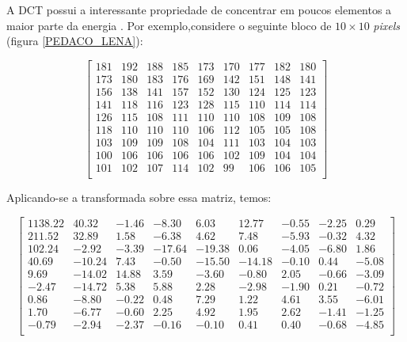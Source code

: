 A DCT possui a interessante propriedade de concentrar em poucos elementos a maior parte da energia \cite{khayam2003discrete}. Por exemplo,considere o seguinte bloco de $10 \times 10$ \textit{pixels} (figura \ref{PEDACO_LENA}):

\begin{center}
\begin{equation}
\label{lena}
\begin{bmatrix}
  181&  192&  188&  185&  173&  170&  177&  182&  180\\
  173&  180&  183&  176&  169&  142&  151&  148&  141\\
  156&  138&  141&  157&  152&  130&  124&  125&  123\\
  141&  118&  116&  123&  128&  115&  110&  114&  114\\
  126&  115&  108&  111&  110&  110&  108&  109&  108\\
  118&  110&  110&  110&  106&  112&  105&  105&  108\\
  103&  109&  109&  108&  104&  111&  103&  104&  103\\
  100&  106&  106&  106&  106&  102&  109&  104&  104\\
  101&  102&  107&  114&  102&   99&  106&  106&  105\\
\end{bmatrix}
\end{equation}
\end{center}

\noindent Aplicando-se a transformada sobre essa matriz, temos:


\begin{center}
	\begin{equation}
\begin{bmatrix}
1138.22&	40.32&	-1.46&	-8.30&	6.03&	12.77&	-0.55&	-2.25&	0.29\\
211.52&	32.89&	1.58&	-6.38&	4.62&	7.48&	-5.93&	-0.32&	4.32\\
102.24&	-2.92&	-3.39&	-17.64&	-19.38&	0.06&	-4.05&	-6.80&	1.86\\	
40.69&	-10.24&	7.43&	-0.50&	-15.50&	-14.18&	-0.10&	0.44&	-5.08\\	
9.69&	-14.02&	14.88&	3.59&	-3.60&	-0.80&	2.05&	-0.66&	-3.09\\
-2.47&	-14.72&	5.38&	5.88&	2.28&	-2.98&	-1.90&	0.21&	-0.72\\
0.86&	-8.80&	-0.22&	0.48&	7.29&	1.22&	4.61&	3.55&	-6.01\\
1.70&	-6.77&	-0.60&	2.25&	4.92&	1.95&	2.62&	-1.41&	-1.25\\
-0.79&	-2.94&	-2.37&	-0.16&	-0.10&	0.41&	0.40&	-0.68&	-4.85\\
\end{bmatrix}	
	\end{equation}
\end{center}


